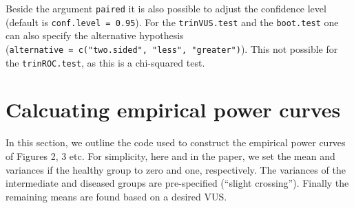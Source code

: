 \documentclass[
]{article}
\newenvironment{Shaded}{\begin{snugshade}}{\end{snugshade}}
\newcommand{\AttributeTok}[1]{\textcolor[rgb]{0.77,0.63,0.00}{#1}}
\newcommand{\CommentTok}[1]{\textcolor[rgb]{0.56,0.35,0.01}{\textit{#1}}}
\newcommand{\ConstantTok}[1]{\textcolor[rgb]{0.00,0.00,0.00}{#1}}
\newcommand{\DecValTok}[1]{\textcolor[rgb]{0.00,0.00,0.81}{#1}}
\newcommand{\FunctionTok}[1]{\textcolor[rgb]{0.00,0.00,0.00}{#1}}
\newcommand{\NormalTok}[1]{#1}
\newcommand{\OtherTok}[1]{\textcolor[rgb]{0.56,0.35,0.01}{#1}}
\newcommand{\SpecialCharTok}[1]{\textcolor[rgb]{0.00,0.00,0.00}{#1}}
\newcommand{\StringTok}[1]{\textcolor[rgb]{0.31,0.60,0.02}{#1}}
\begin{document}
\begin{Shaded}
\end{Shaded}

Beside the argument \texttt{paired} it is also possible to adjust the
confidence level (default is \texttt{conf.level\ =\ 0.95}). For the
\texttt{trinVUS.test} and the \texttt{boot.test} one can also specify
the alternative hypothesis
(\texttt{alternative\ =\ c("two.sided",\ "less",\ "greater")}). This not
possible for the \texttt{trinROC.test}, as this is a chi-squared test.

\hypertarget{calcuating-empirical-power-curves}{%
\section{Calcuating empirical power
curves}\label{calcuating-empirical-power-curves}}

In this section, we outline the code used to construct the empirical
power curves of Figures 2, 3 etc. For simplicity, here and in the paper,
we set the mean and variances if the healthy group to zero and one,
respectively. The variances of the intermediate and diseased groups are
pre-specified (``slight crossing''). Finally the remaining means are
found based on a desired VUS.
\end{document}
